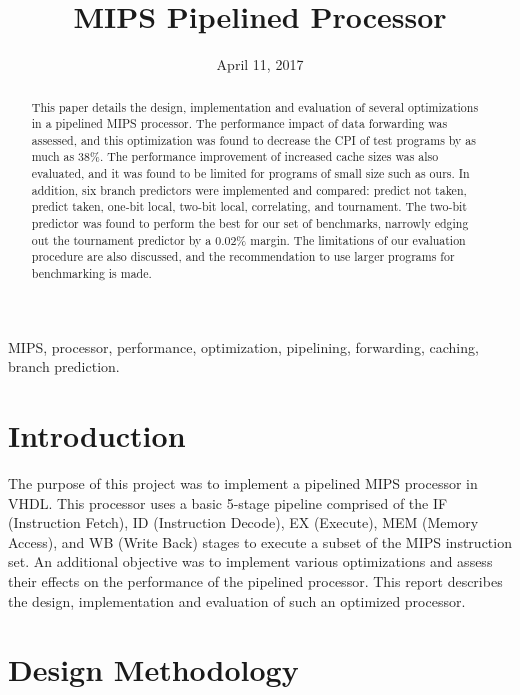 \documentclass[conference,hidelinks]{IEEEtran}
\title{MIPS Pipelined Processor}
\author{
  \IEEEauthorblockN{Andrei Purcarus} \IEEEauthorblockA{260631911}
  \and
  \IEEEauthorblockN{Vladislav Gulevich} \IEEEauthorblockA{260636748}
  \and
  \IEEEauthorblockN{Sebastian Pilarski} \IEEEauthorblockA{260622030}
  \and
  \IEEEauthorblockN{Carlos Bosco} \IEEEauthorblockA{260569326}
}
\date{April 11, 2017}
\begin{document}
\sloppy

\maketitle

\begin{abstract}

This paper details the design, implementation and evaluation of several optimizations in a pipelined MIPS processor. The performance impact of data forwarding was assessed, and this optimization was found to decrease the CPI of test programs by as much as 38\%. The performance improvement of increased cache sizes was also evaluated, and it was found to be limited for programs of small size such as ours. In addition, six branch predictors were implemented and compared: predict not taken, predict taken, one-bit local, two-bit local, correlating, and tournament. The two-bit predictor was found to perform the best for our set of benchmarks, narrowly edging out the tournament predictor by a 0.02\% margin. The limitations of our evaluation procedure are also discussed, and the recommendation to use larger programs for benchmarking is made.

\end{abstract}

\begin{IEEEkeywords}

MIPS, processor, performance, optimization, pipelining, forwarding, caching, branch prediction.

\end{IEEEkeywords}

\section{Introduction}

The purpose of this project was to implement a pipelined MIPS processor in VHDL. This processor uses a basic 5-stage pipeline comprised of the IF (Instruction Fetch), ID (Instruction Decode), EX (Execute), MEM (Memory Access), and WB (Write Back) stages to execute a subset of the MIPS instruction set. An additional objective was to implement various optimizations and assess their effects on the performance of the pipelined processor. This report describes the design, implementation and evaluation of such an optimized processor.

\section{Design Methodology}
\end{document}
